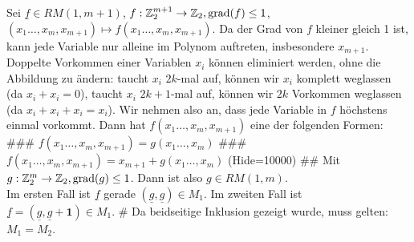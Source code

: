 \begin{myList}
Sei $\underline f\in RM(1, m+1)$, $f:\mathbb{Z}_2^{m+1}\to\mathbb{Z}_2, \text{grad}(f)\leq 1$, $(x_1\ldots, x_m, x_{m+1})\mapsto f(x_1\ldots, x_m, x_{m+1})$. Da der Grad von $f$ kleiner gleich 1 ist, kann jede Variable nur alleine im Polynom auftreten, insbesondere $x_{m+1}$. Doppelte Vorkommen einer Variablen $x_i$ können eliminiert werden, ohne die Abbildung zu ändern: taucht $x_i$ $2k$-mal auf, können wir $x_i$ komplett weglassen (da $x_i + x_i = 0$), taucht $x_i$ $2k+1$-mal auf, können wir $2k$ Vorkommen weglassen (da $x_i+x_i+x_i=x_i$). Wir nehmen also an, dass jede Variable in $f$ höchstens einmal vorkommt. Dann hat $f(x_1\ldots, x_m, x_{m+1})$ eine der folgenden Formen:
### $f(x_1\ldots, x_m, x_{m+1}) = g(x_1\ldots, x_m)$
### $f(x_1\ldots, x_m, x_{m+1}) = x_{m+1} + g(x_1\ldots, x_m)$
\ListProperties(Hide=10000)
## Mit $g:\mathbb{Z}_2^m\to\mathbb{Z}_2, \text{grad}(g)\leq 1$. Dann ist also $g\in RM(1, m)$.\\
Im ersten Fall ist $\underline f$ gerade $(\underline{g}, \underline{g})\in M_1$. Im zweiten Fall ist $\underline{f} = (\underline g, \underline g + \mathbf 1) \in M_1$.
# Da beidseitige Inklusion gezeigt wurde, muss gelten: $M_1=M_2$.
\end{myList}


